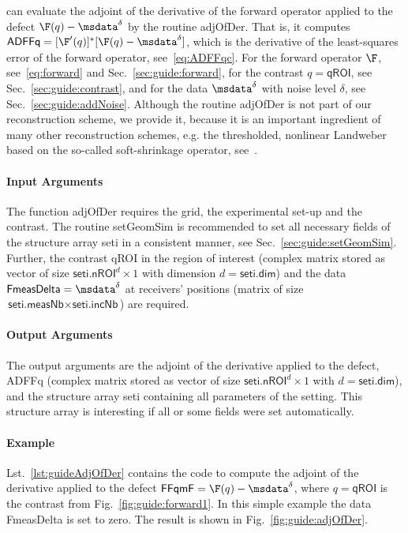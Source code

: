 \documentclass[a4paper]{article}
\begin{document}
\IPscatt can evaluate the adjoint of the derivative of the forward operator applied to the defect $\F(q) - \msdata^\delta$ by the routine \textsf{adjOfDer}. That is, it computes $\textsf{ADFFq} = [\F'(q)]^\ast [\F(q) - \msdata^\delta]$, which is the derivative of the least-squares error of the forward operator, see~\eqref{eq:ADFFqc}. For the forward operator $\F$, see~\eqref{eq:forward} and Sec.~\ref{sec:guide:forward}, for the contrast $q = \textsf{qROI}$, see Sec.~\ref{sec:guide:contrast}, and for the data $\msdata^\delta$ with noise level $\delta$, see Sec.~\ref{sec:guide:addNoise}.
%
Although the routine \textsf{adjOfDer} is not part of our reconstruction scheme, we provide it, because it is an important ingredient of many other reconstruction schemes, e.g. the thresholded, nonlinear Landweber based on the so-called soft-shrinkage operator, see~\cite{Chan2005}. 

\paragraph{Input Arguments} The function \textsf{adjOfDer} requires the grid, the experimental set-up and the contrast. The routine \textsf{setGeomSim} is recommended to set all necessary fields of the structure array \textsf{seti} in a consistent manner, see Sec.~\ref{sec:guide:setGeomSim}. Further, the contrast \textsf{qROI} in the region of interest (complex matrix stored as vector of size $\textsf{seti.nROI}^d \times 1$ with dimension $d = \textsf{seti.dim}$) and the data $\textsf{FmeasDelta} = \msdata^\delta$ at receivers' positions (matrix of size $\textsf{seti.measNb} \times \textsf{seti.incNb}$) are required.

\paragraph{Output Arguments} The output arguments are the adjoint of the derivative applied to the defect, \textsf{ADFFq} (complex matrix stored as vector of size $\textsf{seti.nROI}^d \times 1$ with $d = \textsf{seti.dim}$), and the structure array \textsf{seti} containing all parameters of the setting. This structure array is interesting if all or some fields were set automatically.

\paragraph{Example} Lst.~\ref{lst:guideAdjOfDer} contains the code to compute the adjoint of the derivative applied to the defect $\textsf{FFqmF} = \F(q) - \msdata^\delta$, where $q = \textsf{qROI}$ is the contrast from Fig.~\ref{fig:guide:forward1}. In this simple example the data \textsf{FmeasDelta} is set to zero. The result is shown in Fig.~\ref{fig:guide:adjOfDer}.
\end{document}
